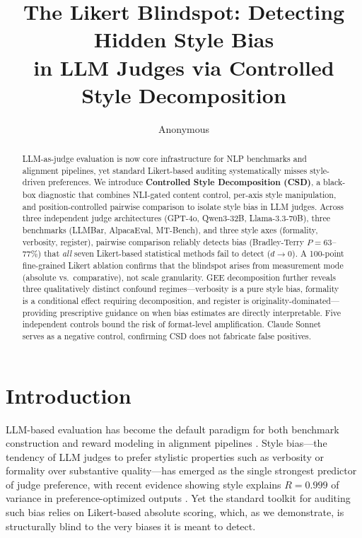 \documentclass[11pt,twocolumn]{article}
\title{The Likert Blindspot: Detecting Hidden Style Bias\\in LLM Judges via Controlled Style Decomposition}
\author{Anonymous}
\date{}
\begin{document}
\maketitle

\begin{abstract}
LLM-as-judge evaluation is now core infrastructure for NLP benchmarks and alignment pipelines, yet standard Likert-based auditing systematically misses style-driven preferences.
We introduce \textbf{Controlled Style Decomposition (CSD)}, a black-box diagnostic that combines NLI-gated content control, per-axis style manipulation, and position-controlled pairwise comparison to isolate style bias in LLM judges.
Across three independent judge architectures (GPT-4o, Qwen3-32B, Llama-3.3-70B), three benchmarks (LLMBar, AlpacaEval, MT-Bench), and three style axes (formality, verbosity, register), pairwise comparison reliably detects bias (Bradley-Terry $P = 63$--$77\%$) that \emph{all} seven Likert-based statistical methods fail to detect ($d \to 0$).
A 100-point fine-grained Likert ablation confirms that the blindspot arises from measurement mode (absolute vs.\ comparative), not scale granularity.
GEE decomposition further reveals three qualitatively distinct confound regimes---verbosity is a pure style bias, formality is a conditional effect requiring decomposition, and register is originality-dominated---providing prescriptive guidance on when bias estimates are directly interpretable.
Five independent controls bound the risk of format-level amplification.
Claude Sonnet serves as a negative control, confirming CSD does not fabricate false positives.
\end{abstract}

\section{Introduction}
\label{sec:intro}

LLM-based evaluation has become the default paradigm for both benchmark construction and reward modeling in alignment pipelines \cite{zheng2024judging,dubois2024alpacafarm}. Style bias---the tendency of LLM judges to prefer stylistic properties such as verbosity or formality over substantive quality---has emerged as the single strongest predictor of judge preference, with recent evidence showing style explains $R = 0.999$ of variance in preference-optimized outputs \cite{wu2024sosbench}. Yet the standard toolkit for auditing such bias relies on Likert-based absolute scoring, which, as we demonstrate, is structurally blind to the very biases it is meant to detect.
\end{document}
